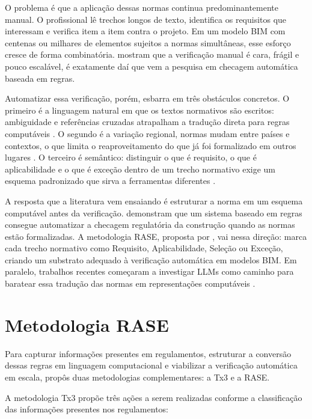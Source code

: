 O problema é que a aplicação dessas normas continua predominantemente manual. O profissional lê trechos longos de texto, identifica os requisitos que interessam e verifica item a item contra o projeto. Em um modelo BIM com centenas ou milhares de elementos sujeitos a normas simultâneas, esse esforço cresce de forma combinatória.  mostram que a verificação manual é cara, frágil e pouco escalável, é exatamente daí que vem a pesquisa em checagem automática baseada em regras.

Automatizar essa verificação, porém, esbarra em três obstáculos concretos. O primeiro é a linguagem natural em que os textos normativos são escritos: ambiguidade e referências cruzadas atrapalham a tradução direta para regras computáveis \cite{dimyadi2013}. O segundo é a variação regional, normas mudam entre países e contextos, o que limita o reaproveitamento do que já foi formalizado em outros lugares \cite{dimyadi2013,solihin2015}. O terceiro é semântico: distinguir o que é requisito, o que é aplicabilidade e o que é exceção dentro de um trecho normativo exige um esquema padronizado que sirva a ferramentas diferentes \cite{solihin2015}.

A resposta que a literatura vem ensaiando é estruturar a norma em um esquema computável antes da verificação.  demonstram que um sistema baseado em regras consegue automatizar a checagem regulatória da construção quando as normas estão formalizadas. A metodologia RASE, proposta por , vai nessa direção: marca cada trecho normativo como Requisito, Aplicabilidade, Seleção ou Exceção, criando um substrato adequado à verificação automática em modelos BIM. Em paralelo, trabalhos recentes começaram a investigar LLMs como caminho para baratear essa tradução das normas em representações computáveis \cite{fuchs2024}.

\section{Metodologia RASE}

Para capturar informações presentes em regulamentos, estruturar a conversão dessas regras em linguagem computacional e viabilizar a verificação automática em escala,  propôs duas metodologias complementares: a Tx3 e a RASE.

A metodologia Tx3 propõe três ações a serem realizadas conforme a classificação das informações presentes nos regulamentos: 

